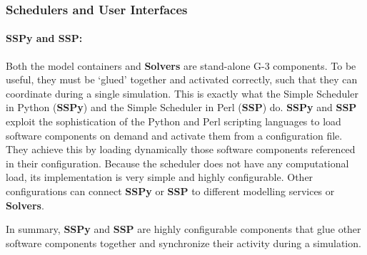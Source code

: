 \documentclass[11pt,3p,twocolumn]{JMN}
\begin{document}
\subsubsection{Schedulers and User Interfaces}

\paragraph{SSPy and SSP:} Both the model containers and {\bf Solvers} are stand-alone G-3 components. To be useful, they must be `glued' together and activated correctly, such that they can coordinate during a single simulation. This is exactly what the Simple Scheduler in Python ({\bf SSPy}) and the Simple Scheduler in Perl ({\bf SSP}) do.
{\bf SSPy} and {\bf SSP} exploit the sophistication of the Python and Perl scripting languages to load software components on demand and activate them from a configuration file. They achieve this by loading dynamically those software components referenced in their configuration. Because the scheduler does not have any computational load, its implementation is very simple and highly configurable. Other configurations can connect {\bf SSPy} or {\bf SSP} to different modelling services or {\bf Solvers}.

In summary, {\bf SSPy} and {\bf SSP}  are highly configurable components that glue other software components together and synchronize their activity during a simulation. 



\end{document}
